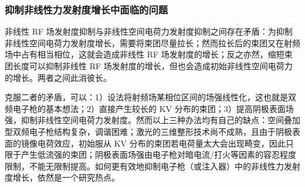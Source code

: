 \subsubsection{抑制非线性力发射度增长中面临的问题}
非线性 RF 场发射度抑制与非线性空间电荷力发射度抑制之间存在矛盾：为抑制非线性空间电荷力发射度增长，需要将束团尽量拉长；然而拉长后的束团又在射频场中占有相当相位，这就会造成非线性 RF 场发射度的增长；反之亦然，缩短束团长度可以抑制非线性 RF 场发射度的增长，但也会造成初始非线性空间电荷力的增长。两者之间此消彼长。

克服二者的矛盾，可以：1）设法将射频场某相位区间的场强线性化，这也就是双频电子枪的基本想法；2）直接产生较长的 KV 分布的束团；3）提高阴极表面场强，抑制非线性空间电荷力发射度。然而以上三种办法均有自己的缺点：空间叠加型双频电子枪结构复杂，调谐困难；激光的三维整形技术尚不成熟，且由于阴极表面的镜像电荷效应，初始服从 KV 分布的束团若电荷量太大会出现畸变，因此只限于产生低流强的束团；阴极表面场强由电子枪对暗电流/打火等因素的容忍程度限制，不能无限制提高。如何更有效地抑制电子枪（或注入器）中的非线性力发射度增长，依然是一个研究热点。
